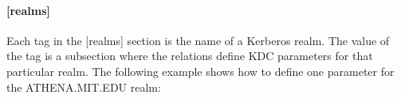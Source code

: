 \documentclass[letterpaper,10pt,english]{sphinxmanual}
\begin{document}
\paragraph{{[}realms{]}}
\label{\detokenize{admin/conf_files/kdc_conf:realms}}\label{\detokenize{admin/conf_files/kdc_conf:kdc-realms}}
\sphinxAtStartPar
Each tag in the {[}realms{]} section is the name of a Kerberos realm.  The
value of the tag is a subsection where the relations define KDC
parameters for that particular realm.  The following example shows how
to define one parameter for the ATHENA.MIT.EDU realm:

\begin{sphinxVerbatim}[commandchars=\\\{\}]
\PYG{p}{[}\PYG{p}{]}
      
             
\end{sphinxVerbatim}
\end{document}
